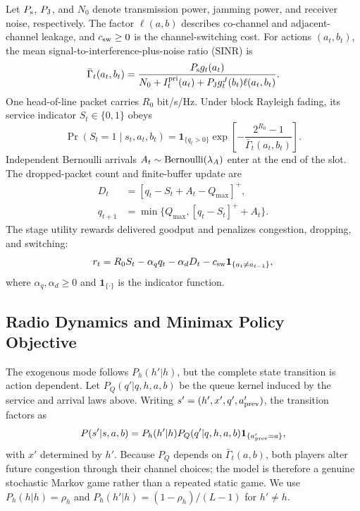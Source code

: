 \documentclass[conference]{IEEEtran}
\begin{document}
Let $P_{\rm s}$, $P_{\rm J}$, and $N_0$ denote transmission power, jamming power, and receiver noise, respectively.
The factor $\ell(a,b)$ describes co-channel and adjacent-channel leakage, and $c_{\rm sw}\geq0$ is the channel-switching cost.
For actions $(a_t,b_t)$, the mean signal-to-interference-plus-noise ratio (SINR) is
\begin{equation}
\bar\Gamma_t(a_t,b_t)=
\frac{P_{\rm s}g_t(a_t)}{N_0+I_t^{\rm pri}(a_t)+P_{\rm J}g_t^J(b_t)\ell(a_t,b_t)}.
\label{eq:reward}
\end{equation}
One head-of-line packet carries $R_0$ bit/s/Hz.
Under block Rayleigh fading, its service indicator $S_t\in\{0,1\}$ obeys
\[
\Pr(S_t=1\mid s_t,a_t,b_t)
=\mathbf 1_{\{q_t>0\}}\exp\!\left[-\frac{2^{R_0}-1}{\bar\Gamma_t(a_t,b_t)}\right].
\]
Independent Bernoulli arrivals $A_t\sim{\rm Bernoulli}(\lambda_A)$ enter at the end of the slot.
The dropped-packet count and finite-buffer update are
\begin{equation}
\begin{aligned}
D_t&=[q_t-S_t+A_t-Q_{\max}]^+,\\
q_{t+1}&=\min\{Q_{\max},[q_t-S_t]^++A_t\}.
\end{aligned}
\label{eq:queue}
\end{equation}
The stage utility rewards delivered goodput and penalizes congestion, dropping, and switching:
\begin{equation}
r_t=R_0S_t-\alpha_q q_t-\alpha_dD_t
-c_{\rm sw}\mathbf 1_{\{a_t\ne a_{t-1}\}},
\label{eq:utility}
\end{equation}
where $\alpha_q,\alpha_d\geq0$ and $\mathbf 1_{\{\cdot\}}$ is the indicator function.

\subsection{Radio Dynamics and Minimax Policy Objective}
The exogenous mode follows $P_h(h'|h)$, but the complete state transition is action dependent.
Let $P_Q(q'|q,h,a,b)$ be the queue kernel induced by the service and arrival laws above.
Writing $s'=(h',x',q',a'_{\rm prev})$, the transition factors as
\[
P(s'|s,a,b)=P_h(h'|h)P_Q(q'|q,h,a,b)
\mathbf 1_{\{a'_{\rm prev}=a\}},
\]
with $x'$ determined by $h'$.
Because $P_Q$ depends on $\bar\Gamma_t(a,b)$, both players alter future congestion through their channel choices; the model is therefore a genuine stochastic Markov game rather than a repeated static game.
We use $P_h(h|h)=\rho_h$ and $P_h(h'|h)=(1-\rho_h)/(L-1)$ for $h'\ne h$.
\end{document}

